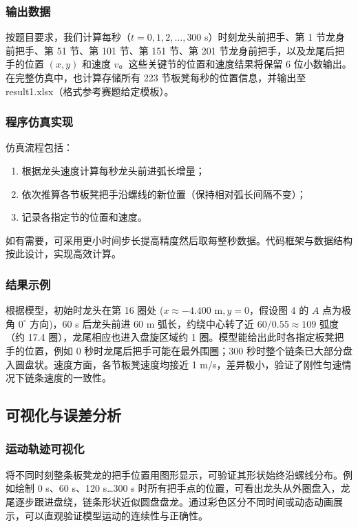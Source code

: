 \documentclass[UTF8]{ctexart}
\begin{document}
\subsubsection{输出数据}
按题目要求，我们计算每秒（$t=0,1,2,\dots,300$ s）时刻龙头前把手、第 1 节龙身前把手、第 51 节、第 101 节、第 151 节、第 201 节龙身前把手，以及龙尾后把手的位置 $(x,y)$ 和速度 $v$。这些关键节的位置和速度结果将保留 6 位小数输出。在完整仿真中，也计算存储所有 223 节板凳每秒的位置信息，并输出至 result1.xlsx（格式参考赛题给定模板）。

\subsubsection{程序仿真实现}
仿真流程包括：
\begin{enumerate}
    \item 根据龙头速度计算每秒龙头前进弧长增量；
    \item 依次推算各节板凳把手沿螺线的新位置（保持相对弧长间隔不变）；
    \item 记录各指定节的位置和速度。
\end{enumerate}
如有需要，可采用更小时间步长提高精度然后取每整秒数据。代码框架与数据结构按此设计，实现高效计算。

\subsubsection{结果示例}
根据模型，初始时龙头在第 16 圈处 ($x\approx -4.400\text{ m}, y=0$，假设图 4 的 $A$ 点为极角 $0^\circ$ 方向)，60 s 后龙头前进 60 m 弧长，约绕中心转了近 $60/0.55\approx109$ 弧度（约 17.4 圈），龙尾相应也进入盘旋区域约 1 圈。模型能给出此时各指定板凳把手的位置，例如 0 秒时龙尾后把手可能在最外围圈；300 秒时整个链条已大部分盘入圆盘状。速度方面，各节板凳速度均接近 1 m/s，差异极小，验证了刚性匀速情况下链条速度的一致性。

\subsection{可视化与误差分析}

\subsubsection{运动轨迹可视化}
将不同时刻整条板凳龙的把手位置用图形显示，可验证其形状始终沿螺线分布。例如绘制 0 s、60 s、120 s…300 s 时所有把手点的位置，可看出龙头从外圈盘入，龙尾逐步跟进盘绕，链条形状近似圆盘盘龙。通过彩色区分不同时间或动态动画展示，可以直观验证模型运动的连续性与正确性。
\end{document}
